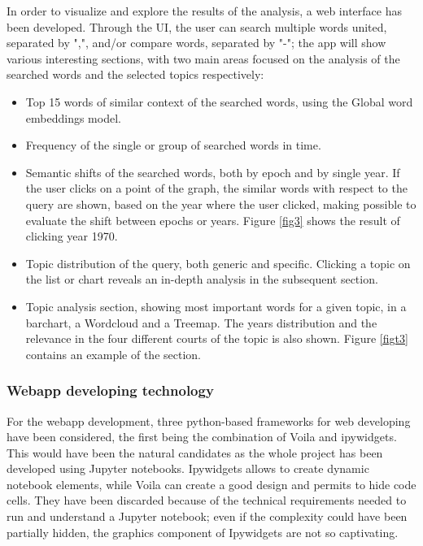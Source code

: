 In order to visualize and explore the results of the analysis, a web interface has been developed. Through the UI, the
user can search multiple words united, separated by ",", and/or compare words, separated by "-"; the app will show
various interesting sections, with two main areas focused on the analysis of the searched words and the selected topics
respectively:
\begin{itemize}
  \item Top 15 words of similar context of the searched words, using the Global word embeddings model.
  \item Frequency of the single or group of searched words in time.
  \item Semantic shifts of the searched words, both by epoch and by single year.
    If the user clicks on a point of the graph, the similar words with respect to the query 
    are shown, based on the year where the user clicked, making possible to evaluate the  
    shift between epochs or years. Figure \vref{fig3} shows the result of clicking year 1970.
  \item Topic distribution of the query, both generic and specific. Clicking 
  a topic on the list or chart reveals an in-depth analysis in the subsequent section.
  \item Topic analysis section, showing most important words for a given topic, in a barchart, 
  a Wordcloud and a Treemap. The years distribution and the relevance in the four different courts of the topic is also shown. Figure \vref{figt3} contains an example of the section.
\end{itemize}

\subsubsection{Webapp developing technology}

For the webapp development, three python-based frameworks for web developing have been considered, the 
first being the combination of Voila and ipywidgets. This would have been the natural candidates as the whole project has 
been developed using Jupyter notebooks. Ipywidgets allows to create dynamic notebook elements, while 
Voila can create a good design and permits to hide code cells.
They have been discarded because of the technical requirements needed to run and understand a Jupyter
notebook; even if the complexity could have been partially hidden, the graphics component of Ipywidgets 
are not so captivating.

